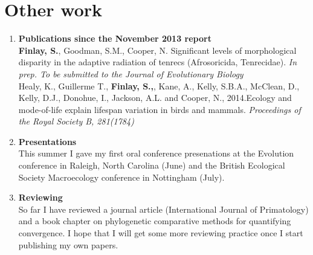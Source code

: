 \documentclass[12pt,a4paper]{article}
\begin{document}
\section{Other work}
\begin{enumerate}

\item \textbf{Publications since the November 2013 report}\\
\textbf{Finlay, S.}, Goodman, S.M., Cooper, N. Significant levels of morphological disparity in the adaptive radiation of tenrecs (Afrosoricida, Tenrecidae). \textit{In prep. To be submitted to the Journal of Evolutionary Biology}\\
\bigskip %
Healy, K., Guillerme T., \textbf{Finlay, S.,}, Kane, A., Kelly, S.B.A., McClean, D., Kelly, D.J., Donohue, I., Jackson, A.L. and Cooper, N., 2014.Ecology and mode-of-life explain lifespan variation in birds and mammals. \textit{Proceedings of the Royal Society B, 281(1784)} 

\item \textbf{Presentations}\\
This summer I gave my first oral conference presenations at the Evolution conference in Raleigh, North Carolina (June) and the British Ecological Society Macroecology conference in Nottingham (July).

\item \textbf{Reviewing}\\

So far I have reviewed a journal article (International Journal of Primatology) and a book chapter on phylogenetic comparative methods for quantifying convergence. I hope that I will get some more reviewing practice once I start publishing my own papers.



\end{enumerate}






\end{document}
